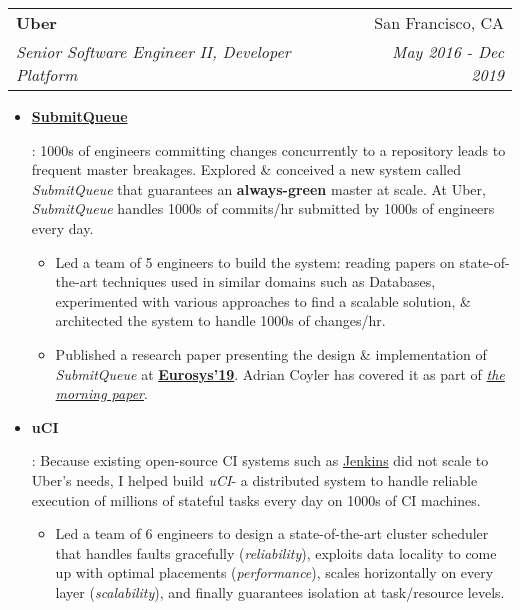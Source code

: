 \documentclass[letterpaper,11pt]{article}
\makeatletter
\newcommand{\resumeItem}[2]{
  \item\small{
    \textbf{#1}{: #2 \vspace{-2pt}}
  }
}
\newcommand{\resumeSubheading}[4]{
  \vspace{-1pt}\item
    \begin{tabular*}{0.97\textwidth}[t]{l@{\extracolsep{\fill}}r}
      \textbf{#1} & #2 \\
      \textit{\small#3} & \textit{\small #4} \\
    \end{tabular*}\vspace{-5pt}
}
\newcommand{\resumeItemListStart}{\begin{itemize}}
\newcommand{\resumeItemListEnd}{\end{itemize}}
\newcommand{\sq}{\textit{SubmitQueue}\xspace}
\newcommand{\uci}{\textit{uCI}\xspace}
\makeatother
\begin{document}
\resumeSubheading
{Uber}{San Francisco, CA}
{Senior Software Engineer II, Developer Platform}{May 2016 - Dec 2019}
\resumeItemListStart
\resumeItem{\href{https://vimeo.com/358691692}{SubmitQueue}}
{
  1000s of engineers committing changes concurrently to a repository leads to frequent master breakages.
  Explored \& conceived a new system called \sq that guarantees an \textbf{always-green} master at scale. At Uber, \sq handles 1000s of commits/hr submitted by 1000s of engineers every day.
  \begin{itemize}[label=\textbf{--}]
    \item
          Led a team of 5 engineers to build the system: reading papers on state-of-the-art techniques used in similar domains such as Databases, experimented with various approaches to find a scalable solution, \& architected the system to handle 1000s of changes/hr.
    \item
          Published a research paper presenting the design \& implementation of \sq at \href{https://doi.org/10.1145/3302424.3303970}{\textbf{Eurosys'19}}. Adrian Coyler has covered it as part of \href{https://blog.acolyer.org/2019/04/18/keeping-master-green-at-scale/}{\textit{the morning paper}}.
  \end{itemize}
}
\resumeItem{uCI}
{
  Because existing open-source CI systems such as \href{https://jenkins.io/}{Jenkins} did not scale to Uber's needs, I helped build \uci - a distributed system to handle reliable execution of millions of stateful tasks every day on 1000s of CI machines.
  \begin{itemize}[label=\textbf{--}]
    \item
          Led a team of 6 engineers to design a state-of-the-art cluster scheduler that handles faults gracefully (\textit{reliability}), exploits data locality to come up with optimal placements (\textit{performance}), scales horizontally on every layer (\textit{scalability}), and finally guarantees isolation at task/resource levels.
  \end{itemize}
}
\resumeItemListEnd
\end{document}
